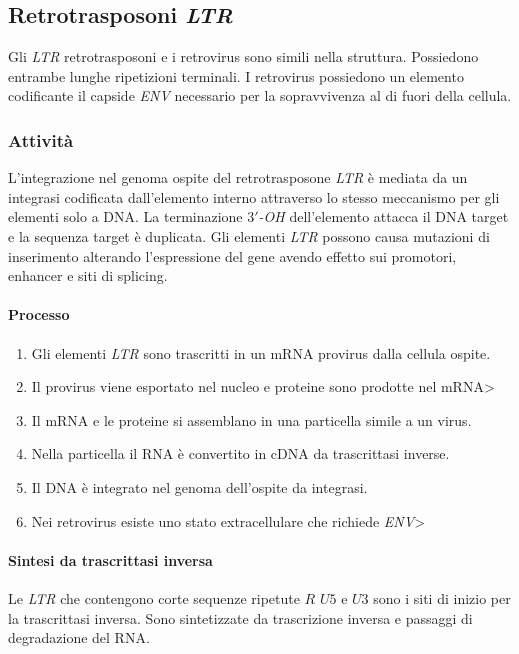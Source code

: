 	\subsection{Retrotrasposoni \emph{LTR}}
	Gli \emph{LTR} retrotrasposoni e i retrovirus sono simili nella struttura.
	Possiedono entrambe lunghe ripetizioni terminali.
	I retrovirus possiedono un elemento codificante il capside \emph{ENV} necessario per la sopravvivenza al di fuori della cellula.

		\subsubsection{Attivit\`a}
		L'integrazione nel genoma ospite del retrotrasposone \emph{LTR} \`e mediata da un integrasi codificata dall'elemento interno attraverso lo stesso meccanismo per gli elementi solo a DNA.
		La terminazione \emph{$3'$-OH} dell'elemento attacca il DNA target e la sequenza target \`e duplicata.
		Gli elementi \emph{LTR} possono causa mutazioni di inserimento alterando l'espressione del gene avendo effetto sui promotori, enhancer e siti di splicing.

			\paragraph{Processo}
			\begin{enumerate}
				\item Gli elementi \emph{LTR} sono trascritti in un mRNA provirus dalla cellula ospite.
				\item Il provirus viene esportato nel nucleo e proteine sono prodotte nel mRNA>
				\item Il mRNA e le proteine si assemblano in una particella simile a un virus.
				\item Nella particella il RNA \`e convertito in cDNA da trascrittasi inverse.
				\item Il DNA \`e integrato nel genoma dell'ospite da integrasi.
				\item Nei retrovirus esiste uno stato extracellulare che richiede \emph{ENV}>
			\end{enumerate}

			\paragraph{Sintesi da trascrittasi inversa}
			Le \emph{LTR} che contengono corte sequenze ripetute $R$ $U5$ e $U3$ sono i siti di inizio per la trascrittasi inversa.
			Sono sintetizzate da trascrizione inversa e passaggi di degradazione del RNA.

